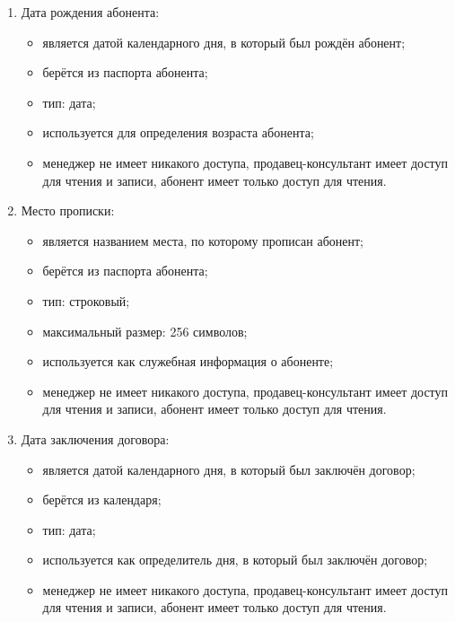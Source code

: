 \begin{enumerate}
\begin{enumerate}
        \item Дата рождения абонента:
        \begin{itemize}
            \item является датой календарного дня, в который был рождён абонент;
            \item берётся из паспорта абонента;
            \item тип: дата;
            \item используется для определения возраста абонента;
            \item менеджер не имеет никакого доступа, продавец-консультант имеет доступ для чтения и записи, абонент имеет только доступ для чтения.
        \end{itemize}

        \item Место прописки:
        \begin{itemize}
            \item является названием места, по которому прописан абонент;
            \item берётся из паспорта абонента;
            \item тип: строковый;
            \item максимальный размер: 256 символов;
            \item используется как служебная информация о абоненте;
            \item менеджер не имеет никакого доступа, продавец-консультант имеет доступ для чтения и записи, абонент имеет только доступ для чтения.
        \end{itemize}

        \item Дата заключения договора:
        \begin{itemize}
            \item является датой календарного дня, в который был заключён договор;
            \item берётся из календаря;
            \item тип: дата;
            \item используется как определитель дня, в который был заключён договор;
            \item менеджер не имеет никакого доступа, продавец-консультант имеет доступ для чтения и записи, абонент имеет только доступ для чтения.
        \end{itemize}


\end{enumerate}
\end{enumerate}
